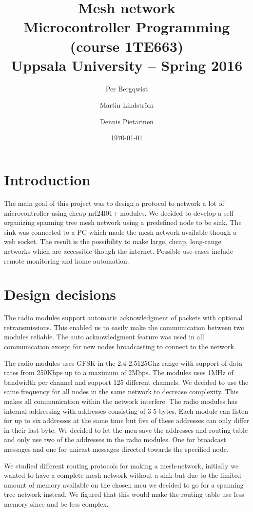 \documentclass[a4paper,11pt]{article}
\title{\textbf{Mesh network}\\
  Microcontroller Programming (course 1TE663)\\
  Uppsala University -- Spring 2016}
\author{Per Bergqwist \and Martin Lindstr\"om \and Dennis Pietarinen}
\date{\today}
\begin{document}
\maketitle

\tableofcontents

\newpage

\section{Introduction}
The main goal of this project was to design a protocol to network a
lot of microcontroller using cheap nrf24l01+ modules.  We decided to
develop a self organizing spanning tree mesh network using a
predefined node to be sink.  The sink was connected to a PC which made
the mesh network available though a web socket.  The result is the
possibility to make large, cheap, long-range networks which are
accessible though the internet.  Possible use-cases include remote
monitoring and home automation.

\section{Design decisions}
The radio modules support automatic acknowledgment of packets with
optional retransmissions. This enabled us to easily make the
communication between two modules reliable. The auto acknowledgment
feature was used in all communication except for new nodes
broadcasting to connect to the network.

The radio modules uses GFSK in the 2.4-2.5125Ghz range with support of
data rates from 250Kbps up to a maximum of 2Mbps. The modules uses
1MHz of bandwidth per channel and support 125 different channels. We
decided to use the same frequency for all nodes in the same network to
decrease complexity. This makes all communication within the network
interfere. The radio modules has internal addressing with addresses
consisting of 3-5 bytes. Each module can listen for up to six
addresses at the same time but five of these addresses can only differ
in their last byte. We decided to let the mcu save the addresses and
routing table and only use two of the addresses in the radio
modules. One for broadcast messages and one for unicast messages
directed towards the specified node.

We studied different routing protocols for making a mesh-network,
initially we wanted to have a complete mesh network without a sink but
due to the limited amount of memory available on the chosen mcu we
decided to go for a spanning tree network instead. We figured that
this would make the routing table use less memory since and be less
complex.
\end{document}
